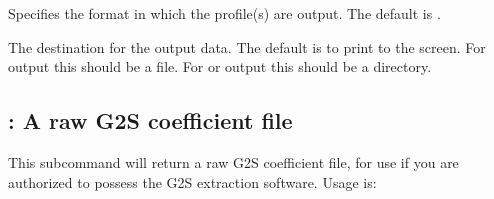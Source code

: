 \documentclass[letterpaper,10pt,english]{sphinxmanual}
\begin{document}
\sphinxAtStartPar
{}
\begin{description}
\sphinxAtStartPar
Specifies the format in which the profile(s) are output.  The default is .

\sphinxAtStartPar
The destination for the output data.  The default is to print to the screen.  For  output this should be a file.  For  or  output this should be a directory.

\sphinxAtStartPar
{}

\sphinxAtStartPar
{}

\end{description}


\subsection{: A raw G2S coefficient file}
\label{\detokenize{userguide:raw-a-raw-g2s-coefficient-file}}
\sphinxAtStartPar
This subcommand will return a raw G2S coefficient file, for use if you are authorized to possess the G2S extraction software.  Usage is:

\sphinxAtStartPar
{}
\end{document}
